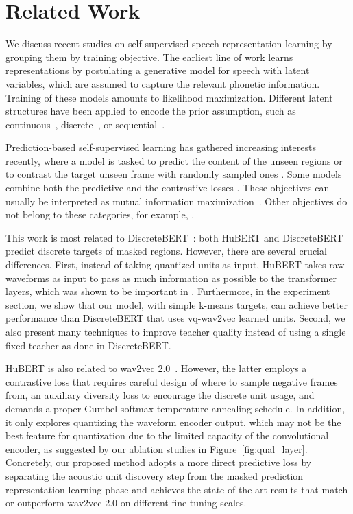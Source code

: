 \section{Related Work}
We discuss recent studies on self-supervised speech representation learning by grouping them by training objective. The earliest line of work learns representations by postulating a generative model for speech with latent variables, which are assumed to capture the relevant phonetic information. Training of these models amounts to likelihood maximization. Different latent structures have been applied to encode the prior assumption, such as continuous~\cite{hsu2017learning}, discrete~\cite{chorowski2019unsupervised,van2017neural}, or sequential~\cite{hsu2017unsupervised,ebbers2017hidden,glarner2018full,khurana2019factorial,khurana2020convolutional}. 


Prediction-based self-supervised learning has gathered increasing interests recently, where a model is tasked to predict the content of the unseen regions \cite{chung2019unsupervised, chung2020generative, chung2020improved, ling2020deep, wang2020unsupervised, liu2020mockingjay, chi2020audio, ling2020decoar} or to contrast the target unseen frame with randomly sampled ones \cite{oord2018representation, kharitonov2020data, schneider2019wav2vec, baevski2020wav2vec}. Some models combine both the predictive and the contrastive losses \cite{baevski2019vq, baevski2019effectiveness}. These objectives can usually be interpreted as mutual information maximization~\cite{tsai2020ssl_multi}. Other objectives do not belong to these categories, for example, \cite{pascual2019learning}.

This work is most related to DiscreteBERT~\cite{baevski2019effectiveness}: both HuBERT and DiscreteBERT predict discrete targets of masked regions. However, there are several crucial differences. First, instead of taking quantized units as input, HuBERT takes raw waveforms as input to pass as much information as possible to the transformer layers, which was shown to be important in \cite{baevski2020wav2vec}. Furthermore, in the experiment section, we show that our model, with simple k-means targets, can achieve better performance than DiscreteBERT that uses vq-wav2vec \cite{baevski2019vq} learned units. Second, we also present many techniques to improve teacher quality instead of using a single fixed teacher as done in DiscreteBERT.


HuBERT is also related to wav2vec 2.0~\cite{baevski2020wav2vec}. However, the latter employs a contrastive loss that requires careful design of where to sample negative frames from, an auxiliary diversity loss to encourage the discrete unit usage, and demands a proper Gumbel-softmax temperature annealing schedule. In addition, it only explores quantizing the waveform encoder output, which may not be the best feature for quantization due to the limited capacity of the convolutional encoder, as suggested by our ablation studies in Figure~\ref{fig:qual_layer}. Concretely, our proposed method adopts a more direct predictive loss by separating the acoustic unit discovery step from the masked prediction representation learning phase and achieves the state-of-the-art results that match or outperform wav2vec 2.0 on different fine-tuning scales.

